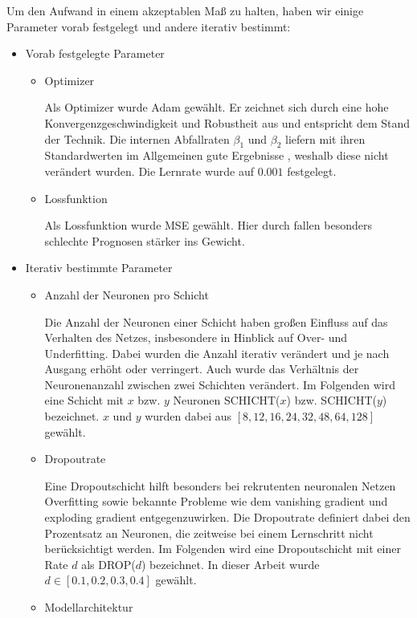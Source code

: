 \documentclass[
12pt, %
toc=listofnumbered, %
toc=chapterentrydotfill, %
numbers=noenddot, %
captions=tableheading, %
bibliography=numbered
]{scrreprt}
\newcommand{\qm}[1]{\glqq#1\grqq{}} %
\begin{document}
Um den Aufwand in einem akzeptablen Maß zu halten, haben wir einige Parameter vorab festgelegt und andere iterativ bestimmt:

\begin{itemize}
	\item Vorab festgelegte Parameter
	\begin{itemize}
		\item Optimizer
		
		Als Optimizer wurde Adam gewählt. Er zeichnet sich durch eine hohe Konvergenzgeschwindigkeit und Robustheit aus und entspricht dem Stand der Technik. Die internen Abfallraten $\beta_1$ und $\beta_2$ liefern mit ihren Standardwerten im Allgemeinen gute Ergebnisse \cite{2017_Kingma_AdamMethodStochastic}, weshalb diese nicht verändert wurden. Die Lernrate wurde auf $0.001$ festgelegt.

		\item Lossfunktion
		
		Als Lossfunktion wurde MSE gewählt. Hier durch fallen besonders schlechte Prognosen stärker ins Gewicht.

	\end{itemize}

	\item Iterativ bestimmte Parameter
	\begin{itemize}
		\item Anzahl der Neuronen pro Schicht
		
		Die Anzahl der Neuronen einer Schicht haben großen Einfluss auf das Verhalten des Netzes, insbesondere in Hinblick auf Over- und Underfitting. Dabei wurden die Anzahl iterativ verändert und je nach Ausgang erhöht oder verringert. Auch wurde das Verhältnis der Neuronenanzahl zwischen zwei Schichten verändert. Im Folgenden wird eine Schicht mit $x$ bzw. $y$ Neuronen SCHICHT($x$) bzw. SCHICHT($y$) bezeichnet. $x$ und $y$ wurden dabei aus $[8,12,16,24,32,48,64,128]$ gewählt.

		\item Dropoutrate
		
		Eine Dropoutschicht hilft besonders bei rekrutenten neuronalen Netzen Overfitting sowie bekannte Probleme wie dem \qm{vanishing gradient} und \qm{exploding gradient} entgegenzuwirken. Die Dropoutrate definiert dabei den Prozentsatz an Neuronen, die zeitweise bei einem Lernschritt nicht berücksichtigt werden. Im Folgenden wird eine Dropoutschicht mit einer Rate $d$ als DROP($d$) bezeichnet. In dieser Arbeit wurde $d \in [0.1, 0.2, 0.3, 0.4]$ gewählt.
		\item Modellarchitektur
		

\end{itemize}
\end{itemize}
\end{document}
